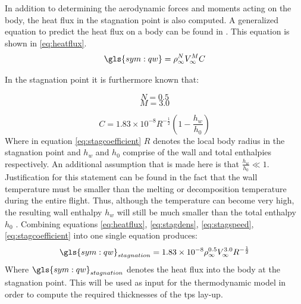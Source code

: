 In addition to determining the aerodynamic forces and moments acting on the body, the heat flux in the stagnation point is also computed. A generalized equation to predict the heat flux on a body can be found in \cite{AndersonJr.2006,Tauber1986}. This equation is shown in \ref{eq:heatflux}.
\begin{equation}
\gls{sym:qw}=\rho_{\infty}^{N}V_{\infty}^{M}C
\label{eq:heatflux}
\end{equation}

In the stagnation point it is furthermore known that: 
\begin{multicols}{2}
\begin{equation}
\label{eq:stagdens}
N=0.5
\end{equation} \break
\begin{equation}
\label{eq:stagspeed}
M=3.0
\end{equation}
\end{multicols}
\begin{equation}
\label{eq:stagcoefficient}
C=1.83 \times 10^{-8} R^{-\frac{1}{2}}\left(1-\frac{h_{w}}{h_{0}}\right)
\end{equation}
Where in equation \ref{eq:stagcoefficient} $R$ denotes the local body radius in the stagnation point and $h_{w}$ and $h_{0}$ comprise of the wall and total enthalpies respectively. An additional assumption that is made here is that $\frac{h_{w}}{h_{0}}\ll 1$. Justification for this statement can be found in the fact that the wall temperature must be smaller than the melting or decomposition temperature during the entire flight. Thus, although the temperature can become very high, the resulting wall enthalpy $h_{w}$ will still be much smaller than the total enthalpy $h_{0}$ \cite[p.347]{AndersonJr.2006}. %
Combining equations \ref{eq:heatflux}, \ref{eq:stagdens}, \ref{eq:stagspeed}, \ref{eq:stagcoefficient} into one single equation produces:
\begin{equation}
\gls{sym:qw}_{stagnation}=1.83 \times 10^{-8}\rho_{\infty}^{0.5} V_{\infty}^{3.0} R^{-\frac{1}{2}}
\label{eq:qstag}
\end{equation}
Where $\gls{sym:qw}_{stagnation}$ denotes the heat flux into the body at the stagnation point. This will be used as input for the thermodynamic model in order to compute the required thicknesses of the \acrfull{tps} lay-up.

